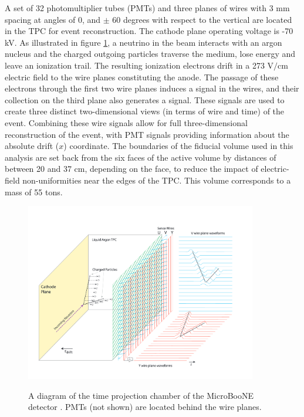 \documentclass[a4paper,11pt]{article}
\begin{document}
A set of 32 photomultiplier tubes (PMTs) and three planes of wires with 3 mm spacing at angles of 0, and $\pm$ 60 degrees with respect to the vertical are located in the TPC for event reconstruction. The cathode plane operating voltage is -70 kV. As illustrated in figure \ref{detector_fig}, a neutrino in the beam interacts with an argon nucleus and the charged outgoing particles traverse the medium, lose energy and leave an ionization trail. The resulting ionization electrons drift in a 273 $\text{V/cm}$ electric field to the wire planes constituting the anode. The passage of these electrons through the first two wire planes induces a signal in the wires, and their collection on the third plane also generates a signal. These signals are used to create three distinct two-dimensional views (in terms of wire and time) of the event. Combining these wire signals allow for full three-dimensional reconstruction of the event, with PMT signals providing information about the absolute drift ($x$) coordinate. The boundaries of the fiducial volume used in this analysis are set back from the six faces of the active volume by distances of between 20 and 37 cm, depending on the face, to reduce the impact of electric-field non-uniformities near the edges of the TPC. This volume corresponds to a mass of 55 tons.\\

\begin{figure}[ht!]
\centering
	\includegraphics[width=0.9\textwidth]{Figures/static_figs/detector2.png} \\
\caption{A diagram of the time projection chamber of the MicroBooNE detector \cite{ub_detectorpaper}. PMTs (not shown) are located behind the wire planes.}\label{detector_fig}
\end{figure}
\end{document}
